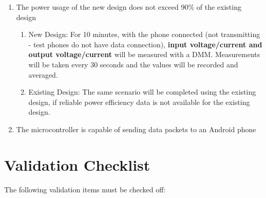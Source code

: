 \documentclass{article}
\numberwithin{figure}{section}
\numberwithin{equation}{section}
\begin{document}
{\begin{enumerate}[align=left,leftmargin=*, labelindent= 0em, label=\textbf{\CheckBox{} Item \thesubsubsection.\arabic*.}, itemindent=0em]
    \item \label{ver1}The power usage of the new design does not exceed 90\% of the existing design
        \begin{enumerate}[label=\CheckBox{}]
            \item New Design: For 10 minutes, with the phone connected (not transmitting - test phones do not have data connection), \textbf{input voltage/current and output voltage/current} will be measured with a DMM. Measurements will be taken every 30 seconds and the values will be recorded and averaged.
            \item Existing Design: The same scenario will be completed using the existing design, if reliable power efficiency data is not available for the existing design.
        \end{enumerate}
    \item \label{ver2}The microcontroller is capable of sending data packets to an Android phone
\end{enumerate}

\newpage

\section{Validation Checklist} \label{sect:validation_chk}
The following validation items must be checked off:

}
\end{document}
